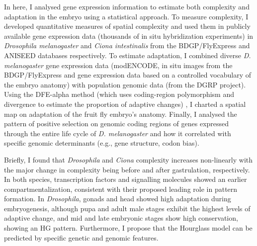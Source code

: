 \hfill\break 
In here, I analysed gene expression information to estimate both complexity and adaptation in the embryo using a statistical approach.
%
To measure complexity, I developed quantitative measures of spatial complexity and used them in publicly available gene expression data (thousands of in situ hybridization experiments) %
 in \textit{Drosophila melanogaster} and \textit{Ciona intestinalis} from the BDGP/FlyExpress and ANISEED databases respectively.
%
To estimate adaptation, I combined diverse \textit{D. melanogaster} gene expression data (modENCODE, in situ images from the BDGP/FlyExpress and gene expression data based on a controlled vocabulary of the embryo anatomy) with population genomic data (from the DGRP project). Using the DFE-alpha method 
(which uses coding-region polymorphism and divergence to estimate the proportion of adaptive changes)
, I charted a spatial map on adaptation of the fruit fly embryo's anatomy. 
Finally, I analysed the pattern of positive selection on genomic coding regions of genes expressed through the entire life cycle of \textit{D. melanogaster} and how it correlated with specific genomic determinants (e.g., gene structure, codon bias).

\hfill\break 
Briefly, I found that \textit{Drosophila} and \textit{Ciona} complexity increases non-linearly with the major change in complexity being before and after gastrulation, respectively. 
In both species, transcription factors and signalling molecules showed an earlier compartmentalization, consistent with their proposed leading role in pattern formation.
%
In \textit{Drosophila}, gonads and head showed high adaptation during embryogenesis, although pupa and adult male stages exhibit the highest levels of adaptive change, and mid and late embryonic stages show high conservation, showing an HG pattern.
Furthermore, I propose that the Hourglass model can be predicted by specific genetic and genomic features.
